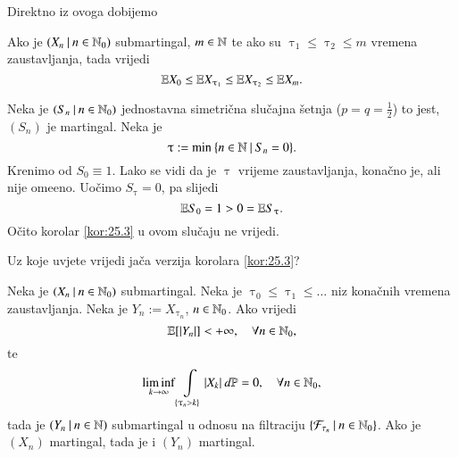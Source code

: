 Direktno iz ovoga dobijemo

\begin{kor} \label{kor:25.3}
    Ako je $({X_n} \: | \: {n \in \mathbb{N}_0})$ submartingal, $m \in \mathbb{N}$ te ako su $\uptau_1 \leq \uptau_2 \leq m$ vremena zaustavljanja, tada vrijedi
    \begin{equation*}
        \mathbb{E} X_0 \leq \mathbb{E} X_{\uptau_1} \leq \mathbb{E} X_{\uptau_2} \leq \mathbb{E} X_m.
    \end{equation*}
\end{kor}

\begin{pr}  \label{pr:25.4}
    Neka je $({S_n} \: | \: {n \in \mathbb{N}_0})$ jednostavna simetri\v cna slu\v cajna \v setnja ($p = q = \frac{1}{2}$) to jest, $(S_n)$ je martingal.
    Neka je
    \begin{equation*}
        \uptau := \min \: \{{n \in \mathbb{N}} \: | \: {S_n = 0}\}.
    \end{equation*}
    Krenimo od $S_0 \equiv 1$.
    Lako se vidi da je $\uptau$ vrijeme zaustavljanja, kona\v cno je, ali nije ome\dj eno.
    Uo\v cimo $S_\uptau = 0$, pa slijedi
    \begin{equation*}
        \mathbb{E} S_0 = 1 > 0 = \mathbb{E} S_\uptau.
    \end{equation*}
    O\v cito korolar \ref{kor:25.3} u ovom slu\v caju ne vrijedi.
\end{pr}

Uz koje uvjete vrijedi ja\v ca verzija korolara \ref{kor:25.3}?

\begin{tm}  \label{tm:25.5}
    Neka je $({X_n} \: | \: {n \in \mathbb{N}_0})$ submartingal.
    Neka je $\uptau_0 \leq \uptau_1 \leq \ldots$ niz kona\v cnih vremena zaustavljanja.
    Neka je $Y_n := X_{\uptau_n}$, $n \in \mathbb{N}_0$.
    Ako vrijedi
    \begin{equation}    \label{jed:25.6}
        \mathbb{E} [|Y_n|] < +\infty, \quad \forall n \in \mathbb{N}_0,
    \end{equation}
    te
    \begin{equation}    \label{jed:25.7}
        \liminf\limits_{k \to \infty} \int\limits_{\{ \uptau_n > k \}} |X_k| \: d \mathbb{P} = 0, \quad \forall n \in \mathbb{N}_0,
    \end{equation}
    tada je $({Y_n} \: | \: {n \in \mathbb{N}})$ submartingal u odnosu na filtraciju $\{{\mathcal{F}_{\tau_n}} \: | \: {n \in \mathbb{N}_0}\}$.
    Ako je $(X_n)$ martingal, tada je i $(Y_n)$ martingal.
\end{tm}

